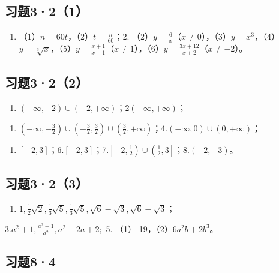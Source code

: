 \subsection{习题3·2（1）}

\begin{enumerate}
\item
  （1）\(n = 60t\)，（2）\(t = \frac{n}{60}\)；2.
  （2）\(y = \frac{6}{x}\)（\(x \neq 0\)），（3）\(y = x^3\)，（4）\(y = \sqrt[3]{x}\)，（5）\(y = \frac{x + 1}{x - 1}\)（\(x \neq 1\)），（6）\(y = \frac{3x + 12}{x + 2}\)（\(x \neq -2\)）。
\end{enumerate}

\subsection{习题3·2（2）}

\begin{enumerate}[start=1]
\item
  \((- \infty, -2) \cup (-2, +\infty)\)；2\((- \infty, +\infty)\)；
\end{enumerate}

\begin{enumerate}[start=3]
\item
  \((- \infty, -\frac{3}{2}) \cup (-\frac{3}{2}, \frac{3}{2}) \cup (\frac{3}{2}, +\infty)\)；4.\((- \infty, 0) \cup (0, +\infty)\)；
\end{enumerate}

\begin{enumerate}[start=5]
\item
  \([-2, 3]\)；6.\([-2, 3]\)；7.\(\left[-2, \frac{1}{2}\right) \cup \left(\frac{1}{2}, 3\right]\)；8.\((-2, -3)\)。
\end{enumerate}

\subsection{习题3·2（3）}

\begin{enumerate}[start=1]
\item
  \(1, \frac{1}{2}\sqrt{2}, \frac{1}{3}\sqrt{5}, \frac{1}{3}\sqrt{5}, \sqrt{6} - \sqrt{3}, \sqrt{6} - \sqrt{3}\)；
\end{enumerate}

3.\(a^2 + 1, \frac{a^2 + 1}{a^2}, a^2 + 2a + 2;\) 5. （1）
19，（2）\(6a^2b + 2b^3\)。

\subsection{习题8·4}

